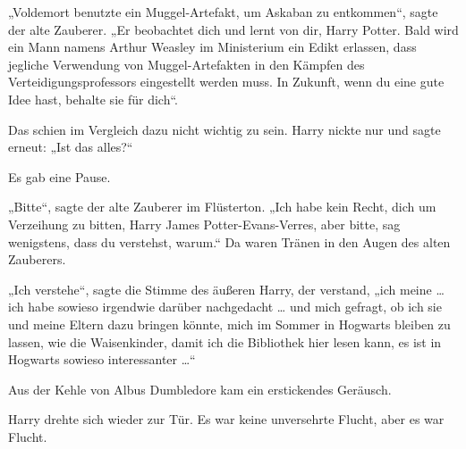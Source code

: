 „Voldemort benutzte ein Muggel-Artefakt, um Askaban zu entkommen“, sagte der alte Zauberer.
„Er beobachtet dich und lernt von dir, Harry Potter. Bald wird ein Mann namens Arthur Weasley im Ministerium ein Edikt erlassen, dass jegliche Verwendung von Muggel-Artefakten in den Kämpfen des Verteidigungsprofessors eingestellt werden muss. In Zukunft, wenn du eine gute Idee hast, behalte sie für dich“.

Das schien im Vergleich dazu nicht wichtig zu sein. Harry nickte nur und sagte erneut:
„Ist das alles?“

Es gab eine Pause.

„Bitte“, sagte der alte Zauberer im Flüsterton.
„Ich habe kein Recht, dich um Verzeihung zu bitten, Harry James Potter-Evans-Verres, aber bitte, sag wenigstens, dass du verstehst, warum.“ Da waren Tränen in den Augen des alten Zauberers.

„Ich verstehe“, sagte die Stimme des äußeren Harry, der verstand, „ich meine … ich habe sowieso irgendwie darüber nachgedacht … und mich gefragt, ob ich sie und meine Eltern dazu bringen könnte, mich im Sommer in Hogwarts bleiben zu lassen, wie die Waisenkinder, damit ich die Bibliothek hier lesen kann, es ist in Hogwarts sowieso interessanter …“

Aus der Kehle von Albus Dumbledore kam ein erstickendes Geräusch.

Harry drehte sich wieder zur Tür. Es war keine unversehrte Flucht, aber es war Flucht.

